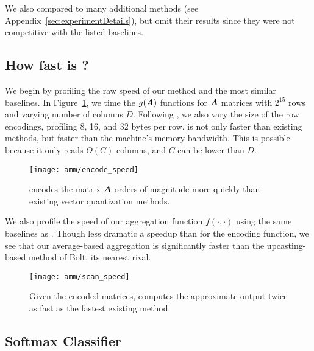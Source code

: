 We also compared to many additional methods (see Appendix~\ref{sec:experimentDetails}), but omit their results since they were not competitive with the listed baselines.

\subsection{How fast is \ours?}

We begin by profiling the raw speed of our method and the most similar baselines. In Figure~\ref{fig:encodeSpeed}, we time the $g(\bm{A})$ functions for $\bm{A}$ matrices with $2^15$ rows and varying number of columns $D$. Following \cite{bolt}, we also vary the size of the row encodings, profiling 8, 16, and 32 bytes per row. \oursp is not only faster than existing methods, but faster than the machine's memory bandwidth. This is possible because it only reads $O(C)$ columns, and $C$ can be lower than $D$.

\begin{figure}[h]
\begin{center}
\texttt{[image: amm/encode\_speed]}
\caption{\oursp encodes the matrix $\bm{A}$ orders of magnitude more quickly than existing vector quantization methods.}
\label{fig:encodeSpeed}
\end{center}
\end{figure}

We also profile the speed of our aggregation function $f(\cdot, \cdot)$ using the same baselines as \citet{bolt}. Though less dramatic a speedup than for the encoding function, we see that our average-based aggregation is significantly faster than the upcasting-based method of Bolt, its nearest rival.

\begin{figure}[h]
\begin{center}
\texttt{[image: amm/scan\_speed]}
\caption{Given the encoded matrices, \oursp computes the approximate output twice as fast as the fastest existing method.}
\label{fig:scanSpeed}
\end{center}
\end{figure}

\subsection{Softmax Classifier}

